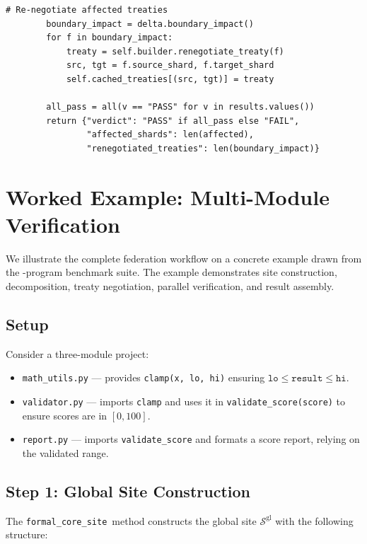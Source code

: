 \documentclass[11pt]{article}
\newcommand{\GlobalSite}{\mathcal{S}^{\mathrm{gl}}}
\newcommand{\FormalCore}{\texttt{formal\_core\_site}}
\begin{document}
\begin{lstlisting}[style=jugeo-python]
        # Re-negotiate affected treaties
        boundary_impact = delta.boundary_impact()
        for f in boundary_impact:
            treaty = self.builder.renegotiate_treaty(f)
            src, tgt = f.source_shard, f.target_shard
            self.cached_treaties[(src, tgt)] = treaty
        
        all_pass = all(v == "PASS" for v in results.values())
        return {"verdict": "PASS" if all_pass else "FAIL",
                "affected_shards": len(affected),
                "renegotiated_treaties": len(boundary_impact)}
\end{lstlisting}


\section{Worked Example: Multi-Module Verification}\label{sec:worked-example}

We illustrate the complete federation workflow on a concrete example
drawn from the \ppLIIItotalPrograms-program benchmark suite.  The
example demonstrates site construction, decomposition, treaty
negotiation, parallel verification, and result assembly.

\subsection{Setup}

Consider a three-module project:
\begin{itemize}[noitemsep]
  \item \texttt{math\_utils.py} --- provides \texttt{clamp(x, lo, hi)}
        ensuring $\texttt{lo} \le \texttt{result} \le \texttt{hi}$.
  \item \texttt{validator.py} --- imports \texttt{clamp} and uses it
        in \texttt{validate\_score(score)} to ensure scores are in
        $[0, 100]$.
  \item \texttt{report.py} --- imports \texttt{validate\_score} and
        formats a score report, relying on the validated range.
\end{itemize}

\subsection{Step 1: Global Site Construction}

The \FormalCore\ method constructs the global site $\GlobalSite$
with the following structure:
\end{document}
